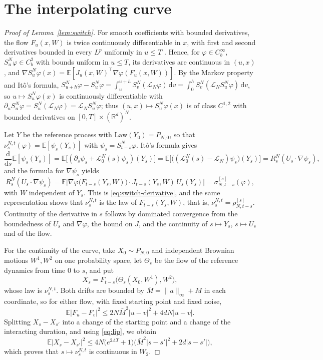 \documentclass[11pt]{amsart}
\numberwithin{equation}{section}
\theoremstyle{plain}
\theoremstyle{remark}
\newcommand{\R}{\mathbb{R}}
\newcommand{\E}{\mathbb{E}}
\newcommand{\cL}{\mathcal{L}}
\newcommand{\W}{W_2}
\newcommand{\Law}{\mathrm{Law}}
\newcommand{\dd}{\mathrm{d}}
\begin{document}
\section{The interpolating curve}\label{sec:switch}

\begin{proof}[Proof of Lemma~\ref{lem:switch}]
For smooth coefficients with bounded derivatives, the flow $F_u(x,W)$ is twice continuously differentiable in $x$, with first and second derivatives bounded in every $L^p$ uniformly in $u\le T$ \cite[Chapter~4]{Kun90}. Hence, for $\varphi\in C^\infty_b$, $S^N_u\varphi\in C^2_b$ with bounds uniform in $u\le T$, its derivatives are continuous in $(u,x)$, and $\nabla S^N_u\varphi(x)=\E[J_u(x,W)^{\top}\nabla\varphi(F_u(x,W))]$. By the Markov property and It\^o's formula, $S^N_{u+h}\varphi-S^N_u\varphi=\int_u^{u+h}S^N_v(\cL_N\varphi)\,\dd v=\int_0^hS^N_v(\cL_NS^N_u\varphi)\,\dd v$, so $u\mapsto S^N_u\varphi(x)$ is continuously differentiable with $\partial_uS^N_u\varphi=S^N_u(\cL_N\varphi)=\cL_NS^N_u\varphi$; thus $(u,x)\mapsto S^N_u\varphi(x)$ is of class $C^{1,2}$ with bounded derivatives on $[0,T]\times(\R^d)^N$.

Let $Y$ be the reference process with $\Law(Y_0)=P_{N,0}$, so that $\nu^{N,t}_s(\varphi)=\E[\psi_s(Y_s)]$ with $\psi_s=S^N_{t-s}\varphi$. It\^o's formula gives
\[
\frac{\dd}{\dd s}\E[\psi_s(Y_s)]=\E\big[(\partial_s\psi_s+\cL^N_0(s)\psi_s)(Y_s)\big]=\E\big[\big((\cL^N_0(s)-\cL_N)\psi_s\big)(Y_s)\big]=R^N_s(U_s\cdot\nabla\psi_s),
\]
and the formula for $\nabla\psi_s$ yields
\[
R^N_s(U_s\cdot\nabla\psi_s)=\E\big[\nabla\varphi\big(F_{t-s}(Y_s,W)\big)\cdot J_{t-s}(Y_s,W)\,U_s(Y_s)\big]=\sigma^{[s]}_{N,t-s}(\varphi),
\]
with $W$ independent of $Y_s$. This is \eqref{eq:switch-derivative}, and the same representation shows that $\nu^{N,t}_s$ is the law of $F_{t-s}(Y_s,W)$, that is, $\nu^{N,t}_s=\rho^{[s]}_{N,t-s}$. Continuity of the derivative in $s$ follows by dominated convergence from the boundedness of $U_s$ and $\nabla\varphi$, the bound on $J$, and the continuity of $s\mapsto Y_s$, $s\mapsto U_s$ and of the flow.

For the continuity of the curve, take $X_0\sim P_{N,0}$ and independent Brownian motions $W^1,W^2$ on one probability space, let $\Theta_s$ be the flow of the reference dynamics from time $0$ to $s$, and put
\[
X_s=F_{t-s}\big(\Theta_s(X_0,W^1),W^2\big),
\]
whose law is $\nu^{N,t}_s$. Both drifts are bounded by $\bar M=\|a\|_\infty+M$ in each coordinate, so for either flow, with fixed starting point and fixed noise,
\[
\E|F_u-F_v|^2\le2N\bar M^2|u-v|^2+4dN|u-v|.
\]
Splitting $X_s-X_{s'}$ into a change of the starting point and a change of the interacting duration, and using \eqref{eq:lip}, we obtain
\[
\E|X_s-X_{s'}|^2\le4N\big(e^{2\Lambda T}+1\big)\big(\bar M^2|s-s'|^2+2d|s-s'|\big),
\]
which proves that $s\mapsto\nu^{N,t}_s$ is continuous in $\W$.
\end{proof}
\end{document}
